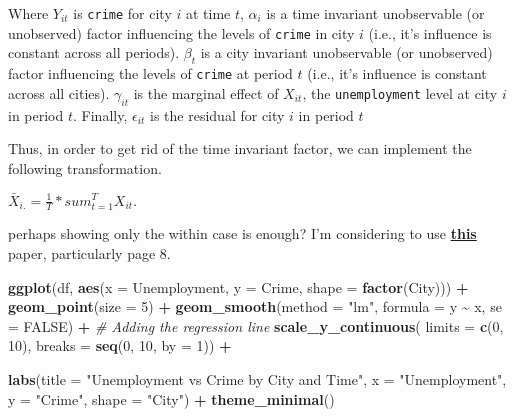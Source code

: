 \documentclass[
]{book}
\newenvironment{Shaded}{\begin{snugshade}}{\end{snugshade}}
\newcommand{\AttributeTok}[1]{\textcolor[rgb]{0.13,0.29,0.53}{#1}}
\newcommand{\CommentTok}[1]{\textcolor[rgb]{0.56,0.35,0.01}{\textit{#1}}}
\newcommand{\ConstantTok}[1]{\textcolor[rgb]{0.56,0.35,0.01}{#1}}
\newcommand{\DecValTok}[1]{\textcolor[rgb]{0.00,0.00,0.81}{#1}}
\newcommand{\FunctionTok}[1]{\textcolor[rgb]{0.13,0.29,0.53}{\textbf{#1}}}
\newcommand{\NormalTok}[1]{#1}
\newcommand{\SpecialCharTok}[1]{\textcolor[rgb]{0.81,0.36,0.00}{\textbf{#1}}}
\newcommand{\StringTok}[1]{\textcolor[rgb]{0.31,0.60,0.02}{#1}}
\begin{document}
Where \(Y_{it}\) is \texttt{crime} for city \(i\) at time \(t\), \(\alpha_{i}\) is a time invariant unobservable (or unobserved) factor influencing the levels of \texttt{crime} in city \(i\) (i.e., it's influence is constant across all periods). \(\beta_{t}\) is a city invariant unobservable (or unobserved) factor influencing the levels of \texttt{crime} at period \(t\) (i.e., it's influence is constant across all cities). \(\gamma_{it}\) is the marginal effect of \(X_{it}\), the \texttt{unemployment} level at city \(i\) in period \(t\). Finally, \(\epsilon_{it}\) is the residual for city \(i\) in period \(t\)

Thus, in order to get rid of the time invariant factor, we can implement the following transformation.

\(\bar{X}_{i.} = \frac{1}{T}*sum_{t=1}^{T} X_{it}.\)

{perhaps showing only the within case is enough? I'm considering to use \textbf{\href{https://economics.princeton.edu/wp-content/uploads/2021/08/two_way_mundlak-Wooldridge.pdf}{this}} paper, particularly page 8.}

\begin{Shaded}
\begin{Highlighting}[]
\FunctionTok{ggplot}\NormalTok{(df, }\FunctionTok{aes}\NormalTok{(}\AttributeTok{x =}\NormalTok{ Unemployment, }\AttributeTok{y =}\NormalTok{ Crime, }\AttributeTok{shape =} \FunctionTok{factor}\NormalTok{(City))) }\SpecialCharTok{+}
  \FunctionTok{geom\_point}\NormalTok{(}\AttributeTok{size =} \DecValTok{5}\NormalTok{) }\SpecialCharTok{+}
  \FunctionTok{geom\_smooth}\NormalTok{(}\AttributeTok{method =} \StringTok{"lm"}\NormalTok{, }\AttributeTok{formula =}\NormalTok{ y }\SpecialCharTok{\textasciitilde{}}\NormalTok{ x, }\AttributeTok{se =} \ConstantTok{FALSE}\NormalTok{) }\SpecialCharTok{+}  \CommentTok{\# Adding the regression line}
  \FunctionTok{scale\_y\_continuous}\NormalTok{(}
  \AttributeTok{limits =} \FunctionTok{c}\NormalTok{(}\DecValTok{0}\NormalTok{, }\DecValTok{10}\NormalTok{),}
  \AttributeTok{breaks =} \FunctionTok{seq}\NormalTok{(}\DecValTok{0}\NormalTok{, }\DecValTok{10}\NormalTok{, }\AttributeTok{by =} \DecValTok{1}\NormalTok{)) }\SpecialCharTok{+}
  
  \FunctionTok{labs}\NormalTok{(}\AttributeTok{title =} \StringTok{"Unemployment vs Crime by City and Time"}\NormalTok{,}
       \AttributeTok{x =} \StringTok{"Unemployment"}\NormalTok{,}
       \AttributeTok{y =} \StringTok{"Crime"}\NormalTok{,}
       \AttributeTok{shape =} \StringTok{"City"}\NormalTok{) }\SpecialCharTok{+}
  \FunctionTok{theme\_minimal}\NormalTok{()}
\end{Highlighting}
\end{Shaded}
\end{document}
